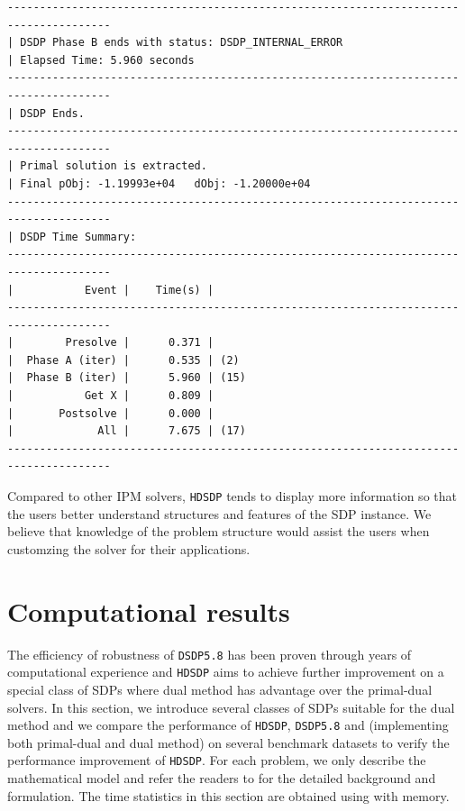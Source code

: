 \documentclass[10pt]{article}
\begin{document}
{\begin{lstlisting}
--------------------------------------------------------------------------------------
| DSDP Phase B ends with status: DSDP_INTERNAL_ERROR                                               
| Elapsed Time: 5.960 seconds                                                                   
--------------------------------------------------------------------------------------
| DSDP Ends.                                                                                        
--------------------------------------------------------------------------------------
| Primal solution is extracted.                                                                    
| Final pObj: -1.19993e+04   dObj: -1.20000e+04 
--------------------------------------------------------------------------------------
| DSDP Time Summary: 
--------------------------------------------------------------------------------------
|           Event |    Time(s) | 
--------------------------------------------------------------------------------------
|        Presolve |      0.371 | 
|  Phase A (iter) |      0.535 | (2) 
|  Phase B (iter) |      5.960 | (15) 
|           Get X |      0.809 | 
|       Postsolve |      0.000 | 
|             All |      7.675 | (17) 
--------------------------------------------------------------------------------------
\end{lstlisting}

Compared to other IPM solvers, {{\texttt{HDSDP}}} tends to display more information so that the users better 
understand structures and features of the SDP instance. We believe that knowledge of
the problem structure would assist the users when customzing the solver for their applications.

\section{Computational results}

The efficiency of robustness of {{\texttt{DSDP5.8}}} has been proven through
years of computational experience and {{\texttt{HDSDP}}} aims to achieve
further improvement on a special class of SDPs where dual method has
advantage over the primal-dual solvers. In this section, we introduce several
classes of SDPs suitable for the dual method and we compare the performance
of {{\texttt{HDSDP}}}, {{\texttt{DSDP5.8}}} and  (implementing both primal-dual and dual method) on
several benchmark datasets to verify the performance improvement of
{{\texttt{HDSDP}}}. For each problem, we only describe the mathematical model
and refer the readers to
{\cite{mittelmann2003independent}}{\cite{borchers1999sdplib}} for the detailed
background and formulation. The time statistics in this section are obtained
using  with
 memory.

}
\end{document}

